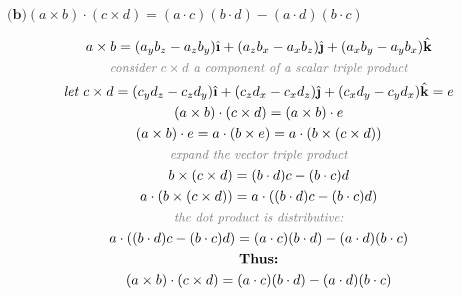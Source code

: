 \documentclass{article}
\newcommand{\ihat}{\hat{\textbf{\i}}}
\newcommand{\jhat}{\hat{\textbf{\j}}}
\newcommand{\khat}{\hat{\textbf{k}}}
\begin{document}
\newpage

{$\textbf{(b)}   (a \times b) \cdot (c \times d) = (a \cdot c)(b \cdot d) - (a \cdot d)(b \cdot c)$} 

\begin{gather*}
    a \times b = (a_y b_z - a_z b_y)\ihat + (a_z b_x - a_x b_z)\jhat + (a_x b_y - a_y b_x)\khat \\
    \small \textit{\color{gray} consider $c \times d$ a component of a scalar triple product}\\
    \textit{let } c \times d = (c_y d_z - c_z d_y)\ihat + (c_z d_x - c_x d_z)\jhat + (c_x d_y - c_y d_x)\khat  = e\\
    (a \times b) \cdot (c \times d) =  (a \times b) \cdot e \\
    (a \times b) \cdot e = a \cdot (b \times e) = a \cdot (b \times (c \times d)) \\
    \small \textit{\color{gray} expand the vector triple product}\\
    b \times (c \times d) = (b \cdot d)c - (b \cdot c)d \\
    a \cdot (b \times (c \times d)) = a \cdot ((b \cdot d)c - (b \cdot c)d) \\
    \small \textit{\color{gray} the dot product is distributive:}\\
    a \cdot ((b \cdot d)c - (b \cdot c)d) = (a \cdot c)(b \cdot d) - (a \cdot d)(b \cdot c) \\
    \textbf{Thus:} \\
    (a \times b) \cdot (c \times d) = (a \cdot c)(b \cdot d) - (a \cdot d)(b \cdot c)
\end{gather*}
\end{document}
